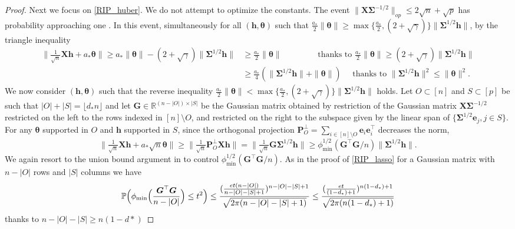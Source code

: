 \documentclass[11pt]{amsart}
\numberwithin{equation}{section}
\numberwithin{equation}{section}
\def\real{{\mathbb{R}}}
\def\R{{\real}}
\def\P{{\mathbb{P}}}
\def\mathbold{\boldsymbol} %
\def\bG{\mathbold{G}}\def\calG{{\cal G}}\def\scrG{{\mathscr G}}\def\Ghat{\widehat{G}}\def\Gtil{{\widetilde G}}
\def\bh{\mathbold{h}}\def\hhat{\widehat{h}}\def\htil{\widetilde{h}}
\def\bP{\mathbold{P}}\def\hbP{{\widehat{\bP}}}\def\tbP{{\widetilde{\bP}}}
\def\be{\mathbold{e}}
\def\bX{\mathbold{X}}\def\hbX{{\widehat{\bX}}}\def\tbX{{\widetilde{\bX}}}\def\bXbar{{\overline \bX}}
\def\btheta{\mathbold{\theta}}\def\thetahat{\widehat{\theta}}\def\htheta{\widehat{\theta}}
\def\bSigma{\mathbold{\Sigma}}\def\hbSigma{{\widehat{\bSigma}}}
\def\calG{{\cal G}}
\begin{document}
\begin{proof}
    Next we focus on \eqref{RIP_huber}. We do not attempt to optimize
    the constants.
    The event $\|\bX\bSigma^{-1/2}\|_{op}\le 2\sqrt n + \sqrt p$
    has probability approaching one
    \cite[Theorem II.13]{DavidsonS01}.
    In this event,
    simultaneously for all $(\bh,\btheta)$ such that
    $\tfrac{a_*}{2}\|\btheta\|\ge 
    \max\{\frac{a_*}{2}, (2+\sqrt \gamma) \}\|\bSigma^{1/2}\bh\|$, 
    by the triangle inequality
    \begin{align*}
    \|\tfrac{1}{\sqrt n}\bX\bh + a_*\btheta\|
    \ge 
    a_*\|\btheta\| - (2+\sqrt \gamma)\|\bSigma^{1/2}\bh\|
    &\ge 
    \tfrac{a_*}{2}\|\btheta\|\qquad\qquad \text{ thanks to }
    \tfrac{a_*}{2}\|\btheta\|\ge 
     (2+\sqrt \gamma) \|\bSigma^{1/2}\bh\|
    \\
    &\ge 
    \tfrac{a_*}{4} (\|\bSigma^{1/2}\bh\|+\|\btheta\|)
    \quad\text{ thanks to }\|\bSigma^{1/2}\bh\|^2\le \|\btheta\|^2
    .
    \end{align*}
    We now consider $(\bh,\btheta)$ such that the reverse inequality
    $\tfrac{a_*}{2}\|\btheta\| < \max\{\frac{a_*}{2}, (2+\sqrt \gamma) \}\|\bSigma^{1/2}\bh\|$ holds.
    Let $O\subset [n]$ and $S\subset[p]$ be such that $|O|+|S| = \lfloor d_*n \rfloor$
    and let $\bG\in \R^{(n-|O|)\times |S|}$ be the Gaussian matrix
    obtained by
    restriction of the Gaussian matrix $\bX\bSigma^{-1/2}$
    restricted on the left to the rows indexed in $[n]\setminus O$,
    and restricted on the right to the subspace
    given by the linear span of $\{\bSigma^{1/2}\be_j, j\in S\}$.
    For any $\btheta$ supported in $O$ and $\bh$ supported in $S$,
    since the orthogonal projection $\bP_O^\perp=\sum_{i\in[n]\setminus O}\be_i\be_i^\top$
    decreases the norm,
    $$
    \|\tfrac{1}{\sqrt n}\bX\bh + a_*\sqrt n\btheta\|
    \ge 
    \|\tfrac{1}{\sqrt n}\bP_O^\perp\bX\bh\|
    =\|\tfrac{1}{\sqrt n}\bG\bSigma^{1/2}\bh\|
    \ge 
    \phi_{\min}^{1/2}(\bG^\top\bG/n)
    \|\bSigma^{1/2}\bh\|
    .$$
    We again resort to the union bound argument in \cite[Proposition 2.10]{blanchard2011compressed}
    to control
    $\phi_{\min}^{1/2}(\bG^\top\bG/n)$.
    As in the proof of \eqref{RIP_lasso} for a Gaussian matrix
    with $n-|O|$ rows and $|S|$ columns we have
    \cite[Proof of Lemma 4.1]{chen2005condition}
    $$\P\Bigl(
    \phi_{\min}\Bigl(\frac{\bG^\top\bG}{n-|O|}\Bigr)
    \le t^2 
    \Bigr)
    \le \frac{(\frac{et(n-|O|)}{n-|O|-|S|+1})^{n-|O|-|S|+1} }{\sqrt{2\pi(n-|O|-|S|+1)}}
    \le \frac{ (\frac{et}{(1-d_*)+1})^{n(1-d_*)+1} }{\sqrt{2\pi(n(1-d_*)+1)}}
    $$
    thanks to $n - |O|-|S|\ge n(1-d*)$

\end{proof}
\end{document}
